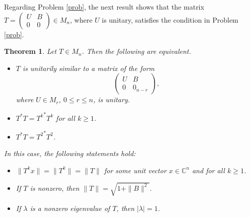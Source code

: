 \documentclass[11pt]{article}
\newtheorem{theorem}{Theorem}[section]
\numberwithin{equation}{section}
\def\IC{{\mathbb C}}
\begin{document}
Regarding Problem \ref{prob}, the next result shows that the matrix
$T=\begin{pmatrix}
U & B \\
0 & 0
\end{pmatrix}\in M_n$,
where $U$ is unitary, satisfies the condition in Problem \ref{prob}.

\begin{theorem}\label{t410}
Let $T\in M_n$. Then the following are equivalent.
\begin{itemize}
  \item[\rm (a)] $T$ is unitarily similar to a matrix of the form
  \[
  \begin{pmatrix}
    U & B\\
    0 & 0_{n-r}
  \end{pmatrix},
  \]
  where $U\in M_r$, $0\le r\le n$, is unitary.
  \item[\rm (b)] $T^*T={T^k}^*T^k$ for all $k\ge 1$.
  \item[\rm (c)] $T^* T={T^2}^* T^2$.
\end{itemize}
In this case, the following statements hold:
\begin{itemize}
  \item[\rm (i)] $\|T^kx\|=\|T^k\|=\|T\|$ for some unit vector $x\in\IC^n$ and for all $k\ge 1$.
    \item[\rm (ii)] If $T$ is nonzero, then $\|T\|=\sqrt{1+\|B\|^2}$.
  \item[\rm (iii)] If $\lambda$ is a nonzero eigenvalue of $T$, then $|\lambda|=1$.
\end{itemize}
\end{theorem}
\end{document}

